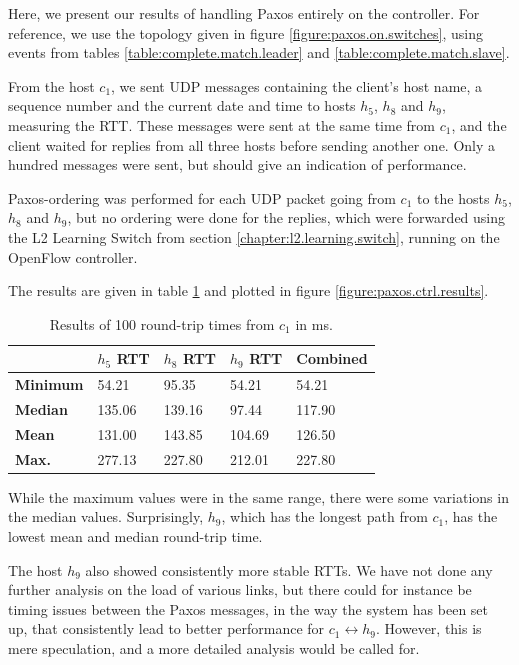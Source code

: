 Here, we present our results of handling Paxos entirely on the controller.
For reference, we use the topology given in figure
\vref{figure:paxos.on.switches}, using events from tables
\vref{table:complete.match.leader} and \vref{table:complete.match.slave}.

From the host $c_1$, we sent UDP messages containing the client's host name,
a sequence number and the current date and time to hosts $h_5$, $h_8$
and $h_9$, measuring the \acf{RTT}.  These messages were sent at the same
time from $c_1$, and the client waited for replies from all three hosts
before sending another one.  Only a hundred messages were sent, but should
give an indication of performance.

Paxos-ordering was performed for each UDP packet going from $c_1$ to the
hosts $h_5$, $h_8$ and $h_9$, but no ordering were done for the replies,
which were forwarded using the L2 Learning Switch from section
\vref{chapter:l2.learning.switch}, running on the
OpenFlow controller.

The results are given in table \ref{table:paxos.ctrl.results} and plotted in
figure \ref{figure:paxos.ctrl.results}.

\begin{table}
  \centering
  \begin{tabular}{|l|l|l|l|l|}
    \hline
      \textbf{} &
      \textbf{$h_5$ RTT} &
      \textbf{$h_8$ RTT} &
      \textbf{$h_9$ RTT} &
      \textbf{Combined}
      \\

    \hline \textbf{Minimum} & 54.21 & 95.35 & 54.21 & 54.21 \\
    \hline \textbf{Median} & 135.06 & 139.16 & 97.44 & 117.90\\
    \hline \textbf{Mean} & 131.00 & 143.85 & 104.69 & 126.50 \\
    \hline \textbf{Max.} & 277.13 & 227.80 & 212.01 & 227.80 \\
    \hline
  \end{tabular}
  \caption{Results of 100 round-trip times from $c_1$ in ms.}
  \label{table:paxos.ctrl.results}
\end{table}

While the maximum values were in the same range, there were some variations in
the median values.  Surprisingly, $h_9$, which has the longest path from $c_1$,
has the lowest mean and median round-trip time.

The host $h_9$ also showed consistently more stable RTTs.
We have not done any further analysis on the load of various links, but
there could for instance be timing issues between the Paxos messages, in the
way the system has been set up, that consistently lead to better performance
for $c_1 \leftrightarrow h_9$.  However, this is mere speculation, and a
more detailed analysis would be called for.

